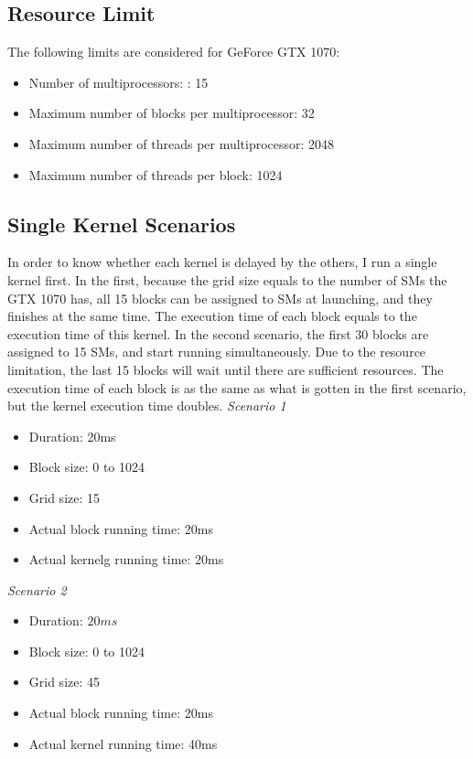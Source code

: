 \documentclass[conference]{IEEEtran}
\begin{document}
\subsection{Resource Limit}
The following limits are considered for GeForce GTX 1070:
\begin{itemize}
   \item Number of multiprocessors: : 15
   \item Maximum number of blocks per multiprocessor: 32
   \item Maximum number of threads per multiprocessor: 2048
   \item Maximum number of threads per block: 1024
\end{itemize}

\subsection{Single Kernel Scenarios}
In order to know whether each kernel is delayed by the others, I run a single kernel first. In the first, because the grid size equals to the number of SMs the GTX 1070 has, all 15 blocks can be assigned to SMs at launching, and they finishes at the same time. The execution time of each block equals to the execution time of this kernel. In the second scenario, the first 30 blocks are assigned to 15 SMs, and start running simultaneously. Due to the resource limitation, the last 15 blocks will wait until there are sufficient resources. The execution time of each block is as the same as what is gotten in the first scenario, but the kernel execution time doubles. \newline
\textit{Scenario 1}
\begin{itemize}
   \item Duration: 20ms
   \item Block size: 0 to 1024
   \item Grid size: 15
   \item Actual block running time: 20ms
   \item Actual kernelg running time: 20ms
\end{itemize}
\textit{Scenario 2}
\begin{itemize}
   \item Duration: $20ms$
   \item Block size: 0 to 1024
   \item Grid size: 45
   \item Actual block running time: 20ms
   \item Actual kernel running time: 40ms
\end{itemize}
\end{document}
